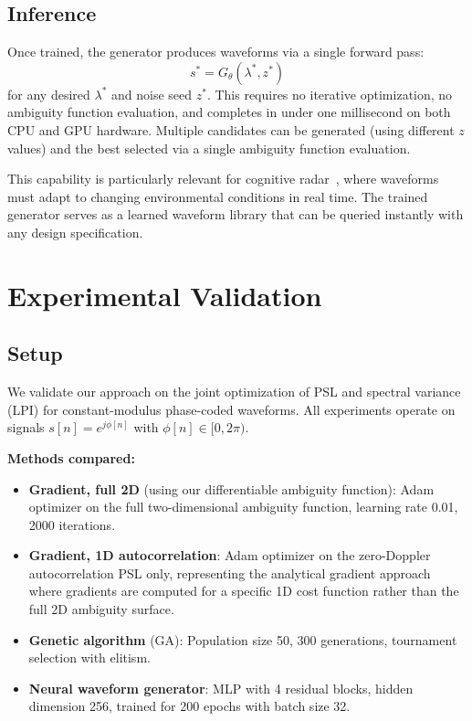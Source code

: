 \documentclass[journal]{IEEEtran}
\begin{document}
\subsection{Inference}

Once trained, the generator produces waveforms via a single forward pass:
\begin{equation}
s^* = G_\theta(\lambda^*, z^*)
\label{eq:inference}
\end{equation}
for any desired $\lambda^*$ and noise seed $z^*$.
This requires no iterative optimization, no ambiguity function evaluation, and completes in under one millisecond on both CPU and GPU hardware.
Multiple candidates can be generated (using different $z$ values) and the best selected via a single ambiguity function evaluation.

This capability is particularly relevant for cognitive radar~\cite{haykin2006cognitive, gurbuz2019cognitive}, where waveforms must adapt to changing environmental conditions in real time.
The trained generator serves as a learned waveform library that can be queried instantly with any design specification.


\section{Experimental Validation}
\label{sec:experiments}

\subsection{Setup}

We validate our approach on the joint optimization of PSL and spectral variance (LPI) for constant-modulus phase-coded waveforms.
All experiments operate on signals $s[n] = e^{j\phi[n]}$ with $\phi[n] \in [0, 2\pi)$.

\textbf{Methods compared:}
\begin{itemize}
    \item \textbf{Gradient, full 2D} (using our differentiable ambiguity function): Adam optimizer on the full two-dimensional ambiguity function, learning rate 0.01, 2000 iterations.
    \item \textbf{Gradient, 1D autocorrelation}: Adam optimizer on the zero-Doppler autocorrelation PSL only, representing the analytical gradient approach where gradients are computed for a specific 1D cost function rather than the full 2D ambiguity surface.
    \item \textbf{Genetic algorithm} (GA): Population size 50, 300 generations, tournament selection with elitism.
    \item \textbf{Neural waveform generator}: MLP with 4 residual blocks, hidden dimension 256, trained for 200 epochs with batch size 32.
\end{itemize}
\end{document}
